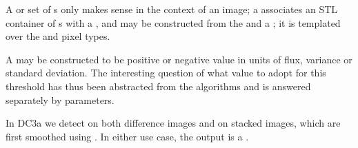A  or set of s only makes sense in the 
context of an image; a  associates an STL container of 
s with a , and may be constructed from 
the  and a ; it is templated over the 
 and  pixel types.

A  may be constructed to be positive or negative value in 
units of flux, variance or standard deviation. The interesting question of what value to 
adopt for this threshold has thus been abstracted from 
the algorithms and is answered separately by  parameters. 

In DC3a we detect on both difference images and on stacked images, which are 
first smoothed using . In either use case, the output
is a .

